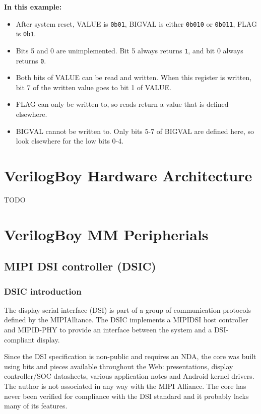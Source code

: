 \documentclass[a4paper, draft, oneside]{memoir}
\newcommand{\bit}[1]{\texttt{#1}}
\newcommand{\bin}[1]{\texttt{0b#1}}
\begin{document}
\begin{register}[H]
  \vspace{3mm}
  \textbf{In this example:}
  \begin{itemize}
    \item{After system reset, VALUE is \bin{01}, BIGVAL is either \bin{010} or \bin{011}, FLAG is \bin{1}.}
    \item{Bits 5 and 0 are unimplemented. Bit 5 always returns \bit{1}, and bit 0 always returns \bit{0}.}
    \item{Both bits of VALUE can be read and written. When this register is written, bit 7 of the written value goes to bit 1 of VALUE.}
    \item{FLAG can only be written to, so reads return a value that is defined elsewhere.}
    \item{BIGVAL cannot be written to. Only bits 5-7 of BIGVAL are defined here, so look elsewhere for the low bits 0-4.}
  \end{itemize}
\end{register}

\clearpage

\tableofcontents

\part{VerilogBoy Hardware Architecture}

TODO

\part{VerilogBoy MM Peripherials}

\chapter{MIPI DSI controller (DSIC)}

\section{DSIC introduction}

The display serial interface (DSI) is part of a group of communication protocols defined by the MIPI\textregistered Alliance. The DSIC implements a MIPI\textregistered DSI host controller and MIPI\textregistered D-PHY to provide an interface between the system and a DSI-compliant display.

Since the DSI specification is non-public and requires an NDA, the core was built using bits and pieces available throughout the Web: presentations, display controller/SOC datasheets, various application notes and Android kernel drivers. The author is not associated in any way with the MIPI Alliance. The core has never been verified for compliance with the DSI standard and it probably lacks many of its features.
\end{document}
